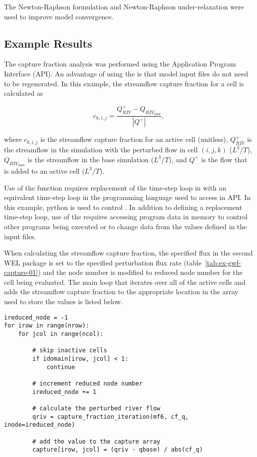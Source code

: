 The Newton-Raphson formulation and Newton-Raphson under-relaxation were used to improve model convergence.


\subsection{Example Results}

The capture fraction analysis was performed using the \MF Application Program Interface (API). An advantage of using the \mfapi is that model input files do not need to be regenerated. In this example, the streamflow capture fraction for a cell is calculated as

\begin{equation}
	\label{eq:capture-fraction}
	c_{k,i,j} = \frac{Q_{RIV}^{+} - Q_{{RIV}_{\text{base}}}}{|Q^{+}|} ,
\end{equation}

\noindent where $c_{k,i,j}$ is the streamflow capture fraction for an active cell (unitless), $Q_{RIV}^{+}$ is the streamflow in the simulation with the perturbed flow in cell $(i,j,k)$ ($L^3/T$), $Q_{{RIV}_{\text{base}}}$ is the streamflow in the base simulation ($L^3/T$), and $Q^{+}$ is the flow that is added to an active cell  ($L^3/T$).

Use of the \mfapi function requires replacement of the time-step loop in \MF with an equivalent time-step loop in the programming language used to access in API. In this example, python is used to control \MF. In addition to defining a replacement time-step loop, use of the \mfapi requires accessing program data in memory to control other programs being executed or to change \MF data from the values defined in the \MF input files. 

When calculating the streamflow capture fraction, the specified flux in the second WEL package is set to the specified perturbation flux rate (table~\ref{tab:ex-gwf-capture-01}) and the node number is modified to reduced node number for the cell being evaluated. The main loop that iterates over all of the active cells and adds the streamflow capture fraction  to the appropriate location in the array used to store the values is listed below.

\begin{lstlisting}
ireduced_node = -1
for irow in range(nrow):
    for jcol in range(ncol):

        # skip inactive cells
        if idomain[irow, jcol] < 1:
            continue

        # increment reduced node number
        ireduced_node += 1

        # calculate the perturbed river flow
        qriv = capture_fraction_iteration(mf6, cf_q, inode=ireduced_node)

        # add the value to the capture array
        capture[irow, jcol] = (qriv - qbase) / abs(cf_q)
\end{lstlisting}

